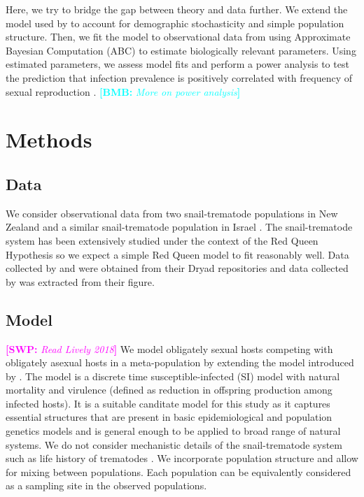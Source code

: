 \documentclass{article}\usepackage[]{graphicx}\usepackage[]{color}
\newcommand{\comment}[3]{\textcolor{#1}{\textbf{[#2: }\textit{#3}\textbf{]}}}
\newcommand{\bmb}[1]{\comment{cyan}{BMB}{#1}}
\newcommand{\swp}[1]{\comment{magenta}{SWP}{#1}}
\begin{document}
Here, we try to bridge the gap between theory and data further.
We extend the model used by \cite{lively2010epidemiological} to account for demographic stochasticity and simple population structure.
Then, we fit the model to observational data from \cite{dagan2013clonal, mckone2016fine, vergara2014infection} using Approximate Bayesian Computation (ABC) to estimate biologically relevant parameters.
Using estimated parameters, we assess model fits and perform a power analysis to test the prediction that infection prevalence is positively correlated with frequency of sexual reproduction \cite{lively2001trematode}.
\bmb{More on power analysis}

\section{Methods}

\subsection{Data}

We consider observational data from two snail-trematode populations in New Zealand \citep{vergara2014infection, mckone2016fine} and a similar snail-trematode population in Israel \citep{dagan2013clonal}. 
The snail-trematode system has been extensively studied under the context of the Red Queen Hypothesis so we expect a simple Red Queen model to fit reasonably well.
Data collected by \cite{dagan2013clonal} and \cite{vergara2014infection} were obtained from their Dryad repositories \citep{dryad_f5t56, dryad_29nk3_2} and data collected by \cite{mckone2016fine} was extracted from their figure.

\subsection{Model}

\swp{Read Lively 2018}
We model obligately sexual hosts competing with obligately asexual hosts in a meta-population by extending the model introduced by \cite{lively2010epidemiological}.
The model is a discrete time susceptible-infected (SI) model with natural mortality and virulence (defined as reduction in offspring production among infected hosts).
It is a suitable canditate model for this study as it captures essential structures that are present in basic epidemiological and population genetics models and is general enough to be applied to broad range of natural systems.
We do not consider mechanistic details of the snail-trematode system such as life history of trematodes \citep{vergara2014infection}.
We incorporate population structure and allow for mixing between populations.
Each population can be equivalently considered as a sampling site in the observed populations.
\end{document}
